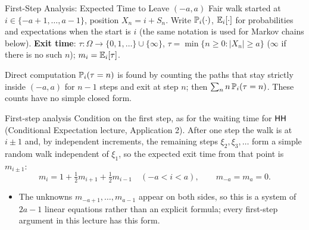\begin{frame}{First-Step Analysis: Expected Time to Leave $(-a,a)$}
  \label{fr:firststep}
  \small
  Fair walk started at $i\in\{-a+1,\dots,a-1\}$, position $X_n=i+S_n$. Write $\mathbb{P}_i(\cdot)$, $\mathbb{E}_i[\cdot]$ for probabilities and expectations when the start is $i$ (the same notation is used for Markov chains below). \textbf{Exit time}: $\tau\colon\Omega\to\{0,1,\dots\}\cup\{\infty\}$, $\tau=\min\{n\ge0 : |X_n|\ge a\}$ ($\infty$ if there is no such $n$); $m_i=\mathbb{E}_i[\tau]$.
  \begin{block}{Direct computation}
    $\mathbb{P}_i(\tau=n)$ is found by counting the paths that stay strictly inside $(-a,a)$ for $n-1$ steps and exit at step $n$; then $\sum_n n\,\mathbb{P}_i(\tau=n)$. These counts have no simple closed form.
  \end{block}
  \begin{block}{First-step analysis}
    Condition on the first step, as for the waiting time for $\mathsf{HH}$ (Conditional Expectation lecture, Application 2). After one step the walk is at $i\pm1$ and, by independent increments, the remaining steps $\xi_2,\xi_3,\dots$ form a simple random walk independent of $\xi_1$, so the expected exit time from that point is $m_{i\pm1}$:
    \[
      m_i=1+\tfrac12 m_{i+1}+\tfrac12 m_{i-1}\quad(-a<i<a),\qquad m_{-a}=m_a=0 .
    \]
  \end{block}
  \begin{itemize}
    \item The unknowns $m_{-a+1},\dots,m_{a-1}$ appear on both sides, so this is a system of $2a-1$ linear equations rather than an explicit formula; every first-step argument in this lecture has this form.
  \end{itemize}
\end{frame}

